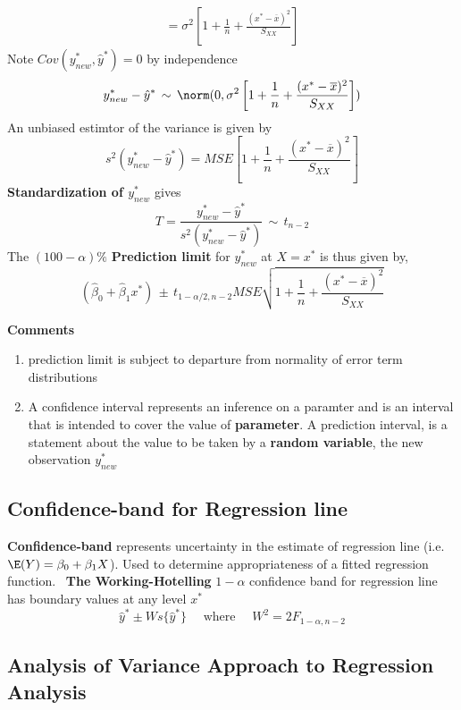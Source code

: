 \documentclass[11pt]{article}
\begin{document}
\begin{defn*}
\begin{align*}
		= \sigma^2 \left[ 1+ \frac{1}{n} +\frac{(x^* - \overline{x})^2}{S_{XX}} \right]
	\end{align*}
	Note $Cov(y^*_{new}, \hat{y}^*) = 0$ by independence
	\[
		y^*_{new} - \hat{y}^* \, \sim \, \norm(0, \sigma^2 \left[ 1+ \frac{1}{n} +\frac{(x^* - \overline{x})^2}{S_{XX}} \right])
	\]
	An unbiased estimtor of the variance is given by 
	\[
		s^2(y^*_{new} - \hat{y}^*) = MSE \left[ 1+ \frac{1}{n} +\frac{(x^* - \overline{x})^2}{S_{XX}} \right]
	\]
	\textbf{Standardization of $y^*_{new}$} gives 
	\[
		T = \frac{y^*_{new} - \hat{y}^*}{s^2(y^*_{new} - \hat{y}^*)} \, \sim \, t_{n-2}
	\]
	The $(100-\alpha)\%$ \textbf{Prediction limit} for $y^*_{new}$ at $X=x^*$ is thus given by,
	\[
		(\hat{\beta}_0 + \hat{\beta}_1 x^*) \, \pm \, t_{1-\alpha/2, n-2} MSE \sqrt{1+ \frac{1}{n} +\frac{(x^* - \overline{x})^2}{S_{XX}} } 
	\]
\end{defn*}

\begin{defn*}
	\textbf{Comments}
	\begin{enumerate}
		\item prediction limit is subject to departure from normality of error term distributions
		\item A confidence interval represents an inference on a paramter and is an interval that is intended to cover the value of \textbf{parameter}. A prediction interval, is a statement about the value to be taken by a \textbf{random variable}, the new observation $y^*_{new}$
	\end{enumerate}
\end{defn*}
 

\subsection*{Confidence-band for Regression line} 

\begin{defn*}
	\textbf{Confidence-band} represents uncertainty in the estimate of regression line (i.e. $\E(Y) = \beta_0 + \beta_1 X$). Used to determine appropriateness of a fitted regression function. \
	\textbf{The Working-Hotelling} $1-\alpha$ confidence band for regression line has boundary values at any level $x^*$
	\[
		\hat{y}^* \pm Ws\{ \hat{y}^*\} \quad \text{ where } \quad W^2 = 2F_{1-\alpha, n-2}
 	\]
\end{defn*}


\subsection*{Analysis of Variance Approach to Regression Analysis}
\end{document}
